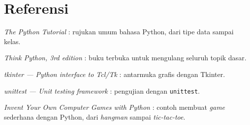 \section*{Referensi}
\begin{daftarrapat}
  \item \textit{The Python Tutorial} \cite{py-tutorial}: rujukan umum bahasa Python, dari tipe data sampai kelas.
  \item \textit{Think Python, 3rd edition} \cite{thinkpython}: buku terbuka untuk mengulang seluruh topik dasar.
  \item \textit{tkinter — Python interface to Tcl/Tk} \cite{py-tkinter}: antarmuka grafis dengan Tkinter.
  \item \textit{unittest — Unit testing framework} \cite{py-unittest}: pengujian dengan \texttt{unittest}.
  \item \textit{Invent Your Own Computer Games with Python} \cite{invent-games}: contoh membuat \textit{game} sederhana dengan Python, dari \textit{hangman} sampai \textit{tic-tac-toe}.
\end{daftarrapat}
